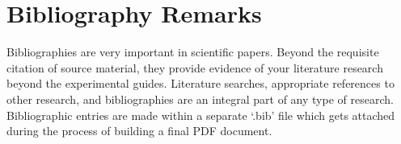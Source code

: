\section{Bibliography Remarks}

Bibliographies are very important in scientific papers.  Beyond the requisite
citation of source material, they provide evidence of your literature research
beyond the experimental guides.  Literature searches, appropriate references to
other research, and bibliographies are an integral part of any type of research.
Bibliographic entries are made within a separate `.bib' file which gets attached
during the process of building a final PDF document.
